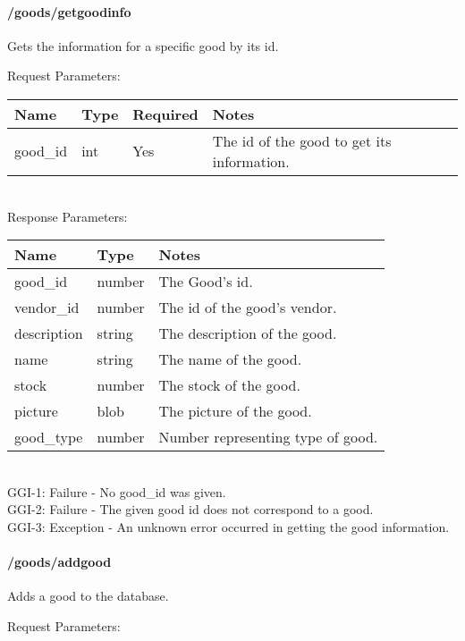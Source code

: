 \documentclass{article}[11pt]
\begin{document}
\paragraph{/goods/getgoodinfo}\textbf{}

Gets the information for a specific good by its id.

\noindent
Request Parameters:

\noindent
\begin{tabular}{|l|l|l|l|}
\hline
\textbf{Name} & \textbf{Type} & \textbf{Required} & \textbf{Notes} \\
\hline
good\_id & int & Yes & The id of the good to get its information. \\
\hline
\end{tabular} \\

\noindent
Response Parameters: \\

\noindent
\begin{tabular}{|l|l|l|}
\hline
\textbf{Name} & \textbf{Type} & \textbf{Notes} \\
\hline
good\_id & number & The Good's id. \\
vendor\_id & number & The id of the good's vendor. \\
description & string & The description of the good. \\
name & string & The name of the good. \\
stock & number & The stock of the good. \\
picture & blob & The picture of the good. \\
good\_type & number & Number representing type of good. \\
\hline
\end{tabular} \\

\ErrorsSession
GGI-1: Failure - No good\_id was given. \\
GGI-2: Failure - The given good id does not correspond to a good. \\
GGI-3: Exception - An unknown error occurred in getting the good information. \\

\paragraph{/goods/addgood}\textbf{}

Adds a good to the database.

\noindent
Request Parameters:
\end{document}
